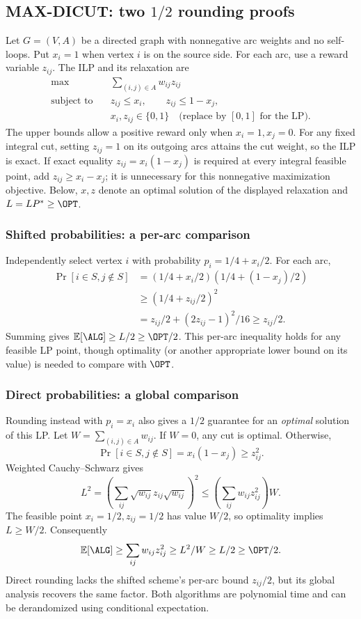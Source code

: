 \subsection{MAX-DICUT: two \texorpdfstring{$1/2$}{1/2} rounding proofs}\label{lp:dicut}
Let $G=(V,A)$ be a directed graph with nonnegative arc weights and no
self-loops. Put $x_i=1$ when vertex $i$ is on the source side. For each arc,
use a reward variable $z_{ij}$. The ILP and its relaxation are
\[
  \begin{aligned}
    \max\quad&\sum_{(i,j)\in A}w_{ij}z_{ij}\\
    \text{subject to}\quad&z_{ij}\le x_i,\qquad z_{ij}\le1-x_j,\\
    &x_i,z_{ij}\in\{0,1\}\quad
       \text{(replace by }[0,1]\text{ for the LP).}
  \end{aligned}
\]
The upper bounds allow a positive reward only when $x_i=1,x_j=0$.
For any fixed integral cut, setting $z_{ij}=1$ on its outgoing arcs attains
the cut weight, so the ILP is exact. If exact equality
$z_{ij}=x_i(1-x_j)$ is required at every integral feasible point, add
$z_{ij}\ge x_i-x_j$; it is unnecessary for this nonnegative maximization
objective. Below, $x,z$ denote an optimal solution of the displayed
relaxation and $L=LP^*\ge\OPT$.

\subsubsection*{Shifted probabilities: a per-arc comparison}
Independently select vertex $i$ with probability $p_i=1/4+x_i/2$.
For each arc,
\[
  \begin{aligned}
    \Pr[i\in S,j\notin S]
      &=(1/4+x_i/2)(1/4+(1-x_j)/2)\\
      &\ge(1/4+z_{ij}/2)^2\\
      &=z_{ij}/2+(2z_{ij}-1)^2/16\ge z_{ij}/2.
  \end{aligned}
\]
Summing gives $\mathbb E[\ALG]\ge L/2\ge\OPT/2$.
This per-arc inequality holds for any feasible LP point, though optimality
(or another appropriate lower bound on its value) is needed to compare
with $\OPT$.

\subsubsection*{Direct probabilities: a global comparison}
Rounding instead with $p_i=x_i$ also gives a $1/2$ guarantee for an
\emph{optimal} solution of this LP. Let $W=\sum_{(i,j)\in A}w_{ij}$.
If $W=0$, any cut is optimal. Otherwise,
\[
  \Pr[i\in S,j\notin S]=x_i(1-x_j)\ge z_{ij}^2.
\]
Weighted Cauchy--Schwarz gives
\[
  L^2=\left(\sum_{ij}\sqrt{w_{ij}}z_{ij}\sqrt{w_{ij}}\right)^2
    \le\left(\sum_{ij}w_{ij}z_{ij}^2\right)W.
\]
The feasible point $x_i=1/2,z_{ij}=1/2$ has value $W/2$, so optimality
implies $L\ge W/2$. Consequently
\[
  \mathbb E[\ALG]\ge\sum_{ij}w_{ij}z_{ij}^2
    \ge L^2/W\ge L/2\ge\OPT/2.
\]
Direct rounding lacks the shifted scheme's per-arc bound $z_{ij}/2$,
but its global analysis recovers the same factor. Both algorithms are
polynomial time and can be derandomized using conditional expectation.

